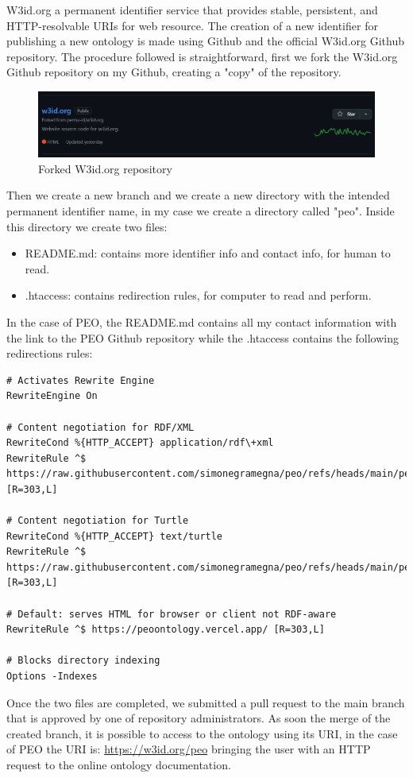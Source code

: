W3id.org a permanent identifier service that provides stable, persistent, and HTTP-resolvable URIs for web resource. The creation of a new identifier for publishing a new ontology is made using Github and the official W3id.org Github repository. The procedure followed is straightforward, first we fork the W3id.org Github repository on my Github, creating a "copy" of the repository. 
\begin{figure}[H]
    \centering
    \includegraphics[width=0.9\linewidth]{Figures/fig_65.png}
    \caption{Forked W3id.org repository}
    \label{fig:enter-label}
\end{figure}
Then we create a new branch and we create a new directory with the intended permanent identifier name, in my case we create a directory called "peo". Inside this directory we create two files:
\begin{itemize}
    \item README.md: contains more identifier info and contact info, for human to read.
    \item .htaccess: contains redirection rules, for computer to read and perform.
\end{itemize}
In the case of PEO, the README.md contains all my contact information with the link to the PEO Github repository while the .htaccess contains the following redirections rules:
\begin{lstlisting}
# Activates Rewrite Engine
RewriteEngine On

# Content negotiation for RDF/XML
RewriteCond %{HTTP_ACCEPT} application/rdf\+xml
RewriteRule ^$ https://raw.githubusercontent.com/simonegramegna/peo/refs/heads/main/peo_ontology.rdf [R=303,L]

# Content negotiation for Turtle
RewriteCond %{HTTP_ACCEPT} text/turtle
RewriteRule ^$ https://raw.githubusercontent.com/simonegramegna/peo/refs/heads/main/peo_ontology.ttl [R=303,L]

# Default: serves HTML for browser or client not RDF-aware
RewriteRule ^$ https://peoontology.vercel.app/ [R=303,L]

# Blocks directory indexing
Options -Indexes
\end{lstlisting}
Once the two files are completed, we submitted a pull request to the main branch that is approved by one of repository administrators. As soon the merge of the created branch, it is possible to access to the ontology using its URI, in the case of PEO the URI is: \href{https://w3id.org/peo}{https://w3id.org/peo} bringing the user with an HTTP request to the online ontology documentation.
